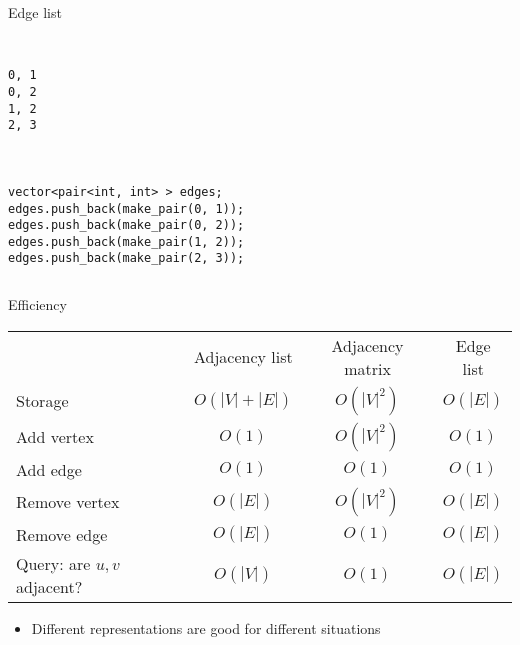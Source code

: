 \documentclass[12pt,t]{beamer}
\newcommand{\bi}{\begin{itemize}}
\newcommand{\ei}{\end{itemize}}
\begin{document}
\begin{frame}[fragile]{Edge list}

    \begin{columns}[T]
        \begin{column}{.4\textwidth}
            \begin{verbatim}

0, 1
0, 2
1, 2
2, 3



vector<pair<int, int> > edges;
edges.push_back(make_pair(0, 1));
edges.push_back(make_pair(0, 2));
edges.push_back(make_pair(1, 2));
edges.push_back(make_pair(2, 3));
            \end{verbatim}
        \end{column}%
        \hfill%
        \begin{column}{.4\textwidth}
            \begin{figure}
            \end{figure}
        \end{column}%
    \end{columns}
\end{frame}

\begin{frame}{Efficiency}

    \vspace{20pt}

    {
        \scriptsize
    \begin{center}
        \begin{tabular}{lccc}
            & Adjacency list & Adjacency matrix & Edge list \\
            Storage & $O(|V| + |E|)$ & $O(|V|^2)$ & $O(|E|)$ \\
            Add vertex & $O(1)$ & $O(|V|^2)$ & $O(1)$ \\
            Add edge & $O(1)$ & $O(1)$ & $O(1)$ \\
            Remove vertex & $O(|E|)$ & $O(|V|^2)$ & $O(|E|)$ \\
            Remove edge & $O(|E|)$ & $O(1)$ & $O(|E|)$ \\
            Query: are $u,v$ adjacent? & $O(|V|)$ & $O(1)$ & $O(|E|)$ \\
        \end{tabular}
    \end{center}
    }

    \bi
        \item Different representations are good for different situations
    \ei
\end{frame}
\end{document}
